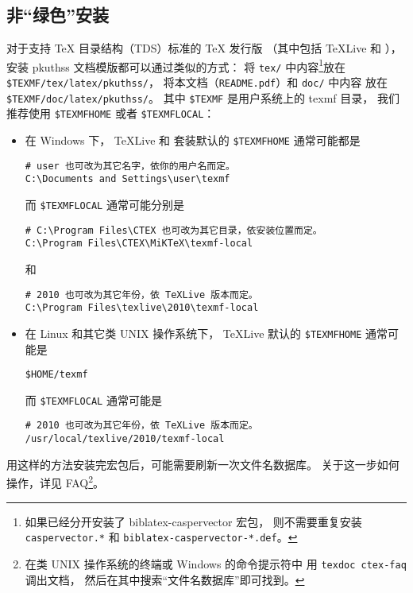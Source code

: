 	\subsection{非“绿色”安装}

	对于支持 \TeX{} 目录结构（TDS）标准的 \TeX{} 发行版%
	（其中包括 \TeX{}Live 和 \CTeX{}），
	安装 pkuthss 文档模版都可以通过类似的方式：
	将 \verb|tex/| 中内容\footnote{%
		如果已经分开安装了 biblatex-caspervector 宏包，
		则不需要重复安装 \texttt{caspervector.*} 和 %
		\texttt{biblatex-caspervector-*.def}。%
	}放在 \verb|$TEXMF/tex/latex/pkuthss/|，
	将本文档（\verb|README.pdf|）和 \verb|doc/| 中内容%
	放在 \verb|$TEXMF/doc/latex/pkuthss/|。
	其中 \verb|$TEXMF| 是用户系统上的 texmf 目录，
	我们推荐使用 \verb|$TEXMFHOME| 或者 \verb|$TEXMFLOCAL|：
	\begin{itemize}
		\item 在 Windows 下，%
			\TeX{}Live 和 \CTeX{} 套装默认的 \verb|$TEXMFHOME| %
			通常可能都是
\begin{Verbatim}[frame = single]
# user 也可改为其它名字，依你的用户名而定。
C:\Documents and Settings\user\texmf
\end{Verbatim}
			而 \verb|$TEXMFLOCAL| 通常可能分别是
\begin{Verbatim}[frame = single]
# C:\Program Files\CTEX 也可改为其它目录，依安装位置而定。
C:\Program Files\CTEX\MiKTeX\texmf-local
\end{Verbatim}
			和
\begin{Verbatim}[frame = single]
# 2010 也可改为其它年份，依 TeXLive 版本而定。
C:\Program Files\texlive\2010\texmf-local
\end{Verbatim}
		\item 在 Linux 和其它类 UNIX 操作系统下，
			\TeX{}Live 默认的 \verb|$TEXMFHOME| 通常可能是
\begin{Verbatim}[frame = single]
$HOME/texmf
\end{Verbatim}
			而 \verb|$TEXMFLOCAL| 通常可能是
\begin{Verbatim}[frame = single]
# 2010 也可改为其它年份，依 TeXLive 版本而定。
/usr/local/texlive/2010/texmf-local
\end{Verbatim}
	\end{itemize}

	用这样的方法安装完宏包后，可能需要刷新一次文件名数据库。
	关于这一步如何操作，详见 \CTeX{} FAQ\supercite{ctex-faq}\footnote{%
		在类 UNIX 操作系统的终端或 Windows 的命令提示符中%
		用 \texttt{texdoc ctex-faq} 调出文档，
		然后在其中搜索“文件名数据库”即可找到。%
	}。


